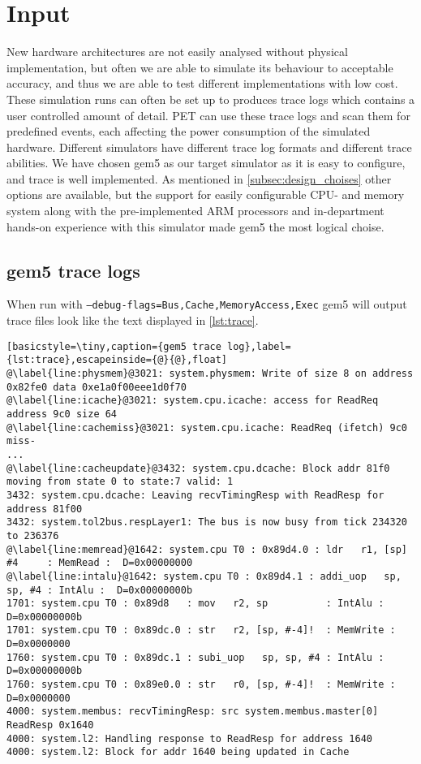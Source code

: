 \section{Input}
New hardware architectures are not easily analysed without physical
implementation, but often we are able to simulate its behaviour to acceptable
accuracy, and thus we are able to test different implementations with low cost.
These simulation runs can often be set up to produces trace logs which contains
a user controlled amount of detail. PET can use these trace logs and scan them
for predefined events, each affecting the power consumption of the simulated
hardware. Different simulators have different trace log formats and different
trace abilities. We have chosen gem5 as our target simulator as it is easy to
configure, and trace is well implemented. As mentioned in
\autoref{subsec:design_choises} other options are available, but the support for
easily configurable CPU- and memory system along with the pre-implemented ARM
processors and in-department hands-on experience with this simulator made gem5
the most logical choise.

\subsection{gem5 trace logs}
When run with \texttt{--debug-flags=Bus,Cache,MemoryAccess,Exec} gem5 will output trace files look like
the text displayed in \autoref{lst:trace}.

\begin{lstlisting}[basicstyle=\tiny,caption={gem5 trace log},label={lst:trace},escapeinside={@}{@},float]
@\label{line:physmem}@3021: system.physmem: Write of size 8 on address 0x82fe0 data 0xe1a0f00eee1d0f70
@\label{line:icache}@3021: system.cpu.icache: access for ReadReq address 9c0 size 64
@\label{line:cachemiss}@3021: system.cpu.icache: ReadReq (ifetch) 9c0 miss-
...
@\label{line:cacheupdate}@3432: system.cpu.dcache: Block addr 81f0 moving from state 0 to state:7 valid: 1
3432: system.cpu.dcache: Leaving recvTimingResp with ReadResp for address 81f00
3432: system.tol2bus.respLayer1: The bus is now busy from tick 234320 to 236376
@\label{line:memread}@1642: system.cpu T0 : 0x89d4.0 : ldr   r1, [sp] #4     : MemRead :  D=0x00000000
@\label{line:intalu}@1642: system.cpu T0 : 0x89d4.1 : addi_uop   sp, sp, #4 : IntAlu :  D=0x00000000b
1701: system.cpu T0 : 0x89d8   : mov   r2, sp          : IntAlu :  D=0x00000000b
1701: system.cpu T0 : 0x89dc.0 : str   r2, [sp, #-4]!  : MemWrite :  D=0x0000000
1760: system.cpu T0 : 0x89dc.1 : subi_uop   sp, sp, #4 : IntAlu :  D=0x00000000b
1760: system.cpu T0 : 0x89e0.0 : str   r0, [sp, #-4]!  : MemWrite :  D=0x0000000
4000: system.membus: recvTimingResp: src system.membus.master[0] ReadResp 0x1640
4000: system.l2: Handling response to ReadResp for address 1640
4000: system.l2: Block for addr 1640 being updated in Cache
\end{lstlisting}

